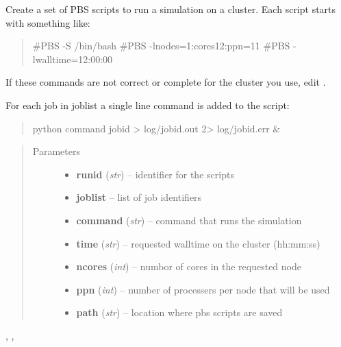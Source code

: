 \documentclass[letterpaper,10pt,english]{sphinxmanual}
\begin{document}
\begin{fulllineitems}
\label{CC3DPipeline:CC3DPipeline.createPBSScripts}
Create a set of PBS scripts to run a simulation on a cluster. Each script starts with something like:
\begin{quote}

\#PBS -S /bin/bash
\#PBS -lnodes=1:cores12:ppn=11
\#PBS -lwalltime=12:00:00
\end{quote}

If these commands are not correct or complete for the cluster you use, edit {\hyperref[CC3DPipeline:CC3DPipeline.createPBS]{}}.

For each job in joblist a single line command is added to the script:
\begin{quote}

python command jobid \textgreater{} log/jobid.out 2\textgreater{} log/jobid.err \&
\end{quote}
\begin{quote}\begin{description}
\item[{Parameters}] \leavevmode\begin{itemize}
\item {} 
\textbf{runid} (\emph{str}) -- identifier for the scripts

\item {} 
\textbf{joblist} -- list of job identifiers

\item {} 
\textbf{command} (\emph{str}) -- command that runs the simulation

\item {} 
\textbf{time} (\emph{str}) -- requested walltime on the cluster (hh:mm:ss)

\item {} 
\textbf{ncores} (\emph{int}) -- numbor of cores in the requested node

\item {} 
\textbf{ppn} (\emph{int}) -- number of processers per node that will be used

\item {} 
\textbf{path} (\emph{str}) -- location where pbs scripts are saved

\end{itemize}

\end{description}\end{quote}




{\hyperref[CC3DPipeline:CC3DPipeline.createPBS]{}}, {\hyperref[CC3DPipeline:CC3DPipeline.addCommandToPBS]{}}, {\hyperref[CC3DPipeline:CC3DPipeline.finishPBS]{}}        



\end{fulllineitems}
\end{document}
